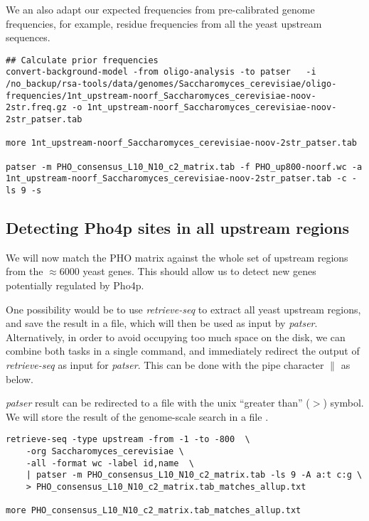 We an also adapt our expected frequencies from pre-calibrated genome
frequencies, for example, residue frequencies from all the yeast
upstream sequences.

{\color{Blue} \begin{footnotesize} 
\begin{verbatim}
## Calculate prior frequencies
convert-background-model -from oligo-analysis -to patser   -i /no_backup/rsa-tools/data/genomes/Saccharomyces_cerevisiae/oligo-frequencies/1nt_upstream-noorf_Saccharomyces_cerevisiae-noov-2str.freq.gz -o 1nt_upstream-noorf_Saccharomyces_cerevisiae-noov-2str_patser.tab

more 1nt_upstream-noorf_Saccharomyces_cerevisiae-noov-2str_patser.tab

patser -m PHO_consensus_L10_N10_c2_matrix.tab -f PHO_up800-noorf.wc -a 1nt_upstream-noorf_Saccharomyces_cerevisiae-noov-2str_patser.tab -c -ls 9 -s
\end{verbatim} \end{footnotesize}
}

\subsection{Detecting Pho4p sites in all upstream regions}

We will now match the PHO matrix against the whole set of upstream
regions from the $\approx 6000$ yeast genes. This should allow us to detect new
genes potentially regulated by Pho4p.

One possibility would be to use \textit{retrieve-seq} to extract all
yeast upstream regions, and save the result in a file, which will then
be used as input by \textit{patser}. Alternatively, in order to avoid
occupying too much space on the disk, we can combine both tasks in a
single command, and immediately redirect the output of
\textit{retrieve-seq} as input for \textit{patser}. This can be done
with the pipe character $\|$ as below.

\textit{patser} result can be redirected to a file with the unix
``greater than'' ($>$) symbol. We will store the result of the
genome-scale search in a file .

{\color{Blue} \begin{footnotesize} 
\begin{verbatim}
retrieve-seq -type upstream -from -1 -to -800  \
    -org Saccharomyces_cerevisiae \
    -all -format wc -label id,name  \
    | patser -m PHO_consensus_L10_N10_c2_matrix.tab -ls 9 -A a:t c:g \
    > PHO_consensus_L10_N10_c2_matrix.tab_matches_allup.txt

more PHO_consensus_L10_N10_c2_matrix.tab_matches_allup.txt
\end{verbatim} \end{footnotesize}
}

